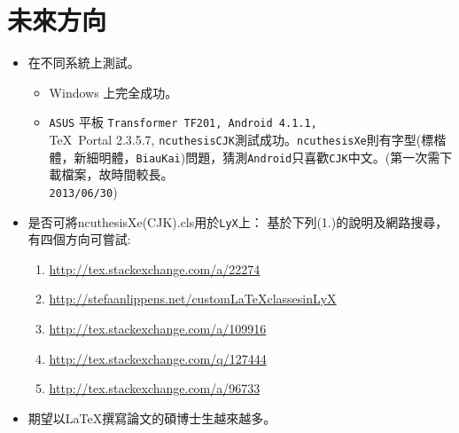 \section{未來方向}
\begin{itemize}
\item 在不同系統上測試。
\begin{itemize}
\item Windows 上完全成功。
\item {\tt ASUS} 平板 {\tt Transformer TF201, Android 4.1.1,} \\
\TeX\ Portal 2.3.5.7, {\tt ncuthesisCJK}測試成功。{\tt ncuthesisXe}則有字型(標楷體，新細明體，{\tt BiauKai})問題，猜測{\tt Android}只喜歡{\tt CJK}中文。(第一次需下載檔案，故時間較長。\\
{\tt 2013/06/30})
\end{itemize}
\item 是否可將ncuthesisXe(CJK).cls用於{\tt LyX}上： 基於下列(1.)的說明及網路搜尋，有四個方向可嘗試:  \index{\TeX!}
\begin{enumerate}
\item \url{http://tex.stackexchange.com/a/22274}
\item \url{http://stefaanlippens.net/customLaTeXclassesinLyX}
\item \url{http://tex.stackexchange.com/a/109916}
\item \url{http://tex.stackexchange.com/q/127444}
\item \url{http://tex.stackexchange.com/a/96733}
\end{enumerate}
\item 期望以\LaTeX{}撰寫論文的碩博士生越來越多。
\end{itemize}
\null\vfil
